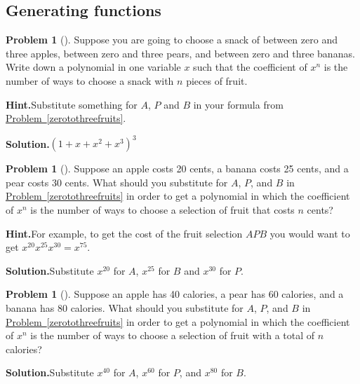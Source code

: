 \documentclass[10pt,]{book}
\theoremstyle{plain}
\theoremstyle{definition}
\newtheorem{activity}[project]{Problem}
\theoremstyle{definition}
\numberwithin{equation}{chapter}
\begin{document}
\subsection[{Generating functions}]{Generating functions}\label{subsection-35}
\begin{activity}[]\label{activity-183}
Suppose you are going to choose a snack of between zero and three apples, between zero and three pears, and between zero and three bananas. Write down a polynomial in one variable \(x\) such that the coefficient of \(x^n\) is the number of ways to choose a snack with \(n\) pieces of fruit.%
\par\medskip\noindent%
\textbf{Hint.}\quad Substitute something for \(A\), \(P\) and \(B\) in your formula from \hyperref[zerotothreefruits]{Problem~\ref{zerotothreefruits}}.%
\par\medskip\noindent%
\textbf{Solution.}\quad \((1+x+x^2+x^3)^3\)%
\end{activity}
\begin{activity}[]\label{activity-184}
Suppose an apple costs 20 cents, a banana costs 25 cents, and a pear costs 30 cents. What should you substitute for \(A\), \(P\), and \(B\) in \hyperref[zerotothreefruits]{Problem~\ref{zerotothreefruits}} in order to get a polynomial in which the coefficient of \(x^n\) is the number of ways to choose a selection of fruit that costs \(n\) cents?%
\par\medskip\noindent%
\textbf{Hint.}\quad For example, to get the cost of the fruit selection \(AP B\) you would want to get \(x^{20} x^{25} x^{30} = x^{75}\).%
\par\medskip\noindent%
\textbf{Solution.}\quad Substitute \(x^{20}\) for \(A\), \(x^{25}\) for \(B\) and \(x^{30}\) for \(P\).%
\end{activity}
\begin{activity}[]\label{activity-185}
Suppose an apple has 40 calories, a pear has 60 calories, and a banana has 80 calories. What should you substitute for \(A\), \(P\), and \(B\) in \hyperref[zerotothreefruits]{Problem~\ref{zerotothreefruits}} in order to get a polynomial in which the coefficient of \(x^n\) is the number of ways to choose a selection of fruit with a total of \(n\) calories?%
\par\medskip\noindent%
\textbf{Solution.}\quad Substitute \(x^{40}\) for \(A\), \(x^{60}\) for \(P\), and \(x^{80}\) for \(B\).%
\end{activity}
\end{document}
